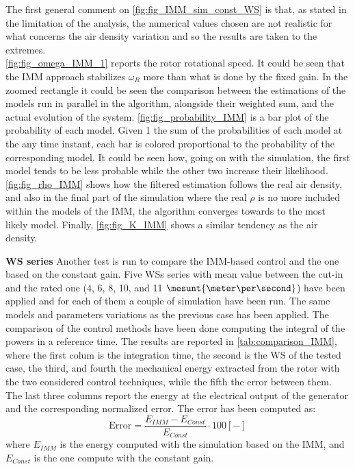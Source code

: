 The first general comment on \autoref{fig:fig_IMM_sim_const_WS} is that, as stated in the limitation of the analysis, the numerical values chosen are not realistic for what concerns the air density variation and so the results are taken to the extremes. \\
\autoref{fig:fig_omega_IMM_1} reports the rotor rotational speed. It could be seen that the IMM approach stabilizes $\omega_R$ more than what is done by the fixed gain. In the zoomed rectangle it could be seen the comparison between the estimations of the models run in parallel in the algorithm, alongside their weighted sum, and the actual evolution of the system. \autoref{fig:fig_probability_IMM} is a bar plot of the probability of each model. Given 1 the sum of the probabilities of each model at the any time instant, each bar is colored proportional to the probability of the corresponding model. It could be seen how, going on with the simulation, the first model tends to be less probable while the other two increase their likelihood. \autoref{fig:fig_rho_IMM} shows how the filtered estimation follows the real air density, and also in the final part of the simulation where the real $\rho$ is no more included within the models of the IMM, the algorithm converges towards to the most likely model. Finally, \autoref{fig:fig_K_IMM} shows a similar tendency as the air density. 

\textbf{WS series}
Another test is run to compare the IMM-based control and the one based on the constant gain. Five WSs series with mean value between the cut-in and the rated one (4, 6, 8, 10, and 11 $\mesunt{\meter\per\second}$) have been applied and for each of them a couple of simulation have been run. The same models and parameters variations as the previous case has been applied. The comparison of the control methods have been done computing the integral of the powers in a reference time. The results are reported in \autoref{tab:comparison_IMM}, where the first colum is the integration time, the second is the WS of the tested case, the third, and fourth the mechanical energy extracted from the rotor with the two considered control techniques, while the fifth the error between them. The last three columns report the energy at the electrical output of the generator and the corresponding normalized error. The error has been computed as:
\begin{equation}
  \text{Error} = \frac{E_{IMM}-E_{Const}}{E_{Const}}\cdot 100 \left[-\right]
  \label{eq:energy_error}
\end{equation}
where $E_{IMM}$ is the energy computed with the simulation based on the IMM, and $E_{Const}$ is the one compute with the constant gain.

